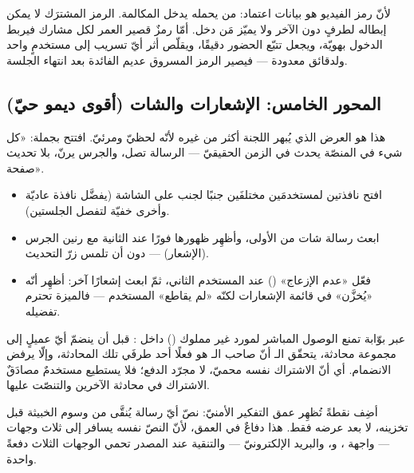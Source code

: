 \begin{qa}
لأنّ رمز الفيديو هو بيانات اعتماد: من يحمله يدخل المكالمة. الرمز المشترَك لا يمكن
إبطاله لطرفٍ دون الآخر ولا يميّز مَن دخل. أمّا رمزٌ قصير العمر لكل مشارك فيربط الدخول
بهويّة، ويجعل تتبّع الحضور دقيقًا، ويقلّص أثر أيّ تسريب إلى مستخدمٍ واحد ولدقائق
معدودة — فيصير الرمز المسروق عديم الفائدة بعد انتهاء الجلسة.
\end{qa}

\subsection{المحور الخامس: الإشعارات والشات (أقوى ديمو حيّ)}

هذا هو العرض الذي يُبهر اللجنة أكثر من غيره لأنّه لحظيّ ومرئيّ. افتتح بجملة: «كل شيء
في المنصّة يحدث في الزمن الحقيقيّ — الرسالة تصل، والجرس يرنّ، بلا تحديث صفحة».

\begin{idea}
\begin{itemize}
\item افتح نافذتين لمستخدمَين مختلفَين جنبًا لجنب على الشاشة (يفضَّل نافذة عاديّة
  وأخرى خفيّة  لتفصل الجلستين).
\item ابعث رسالة شات من الأولى، وأظهِر ظهورها فورًا عند الثانية مع رنين الجرس
  (الإشعار) — دون أن تلمس زرّ التحديث.
\item فعّل «عدم الإزعاج» () عند المستخدم الثاني، ثمّ ابعث إشعارًا
  آخر: أظهِر أنّه «يُخزَّن» في قائمة الإشعارات لكنّه «لم يقاطع» المستخدم — فالميزة
  تحترم تفضيله.
\end{itemize}
\end{idea}

\begin{qa}
عبر بوّابة تمنع الوصول المباشر لمورد غير مملوك () داخل : قبل
أن ينضمّ أيّ عميلٍ إلى مجموعة محادثة، يتحقّق الـ أنّ صاحب الـ هو
فعلًا أحد طرفَي تلك المحادثة، وإلّا يرفض الانضمام. أي أنّ الاشتراك نفسه محميّ، لا
مجرّد الدفع؛ فلا يستطيع مستخدمٌ مصادَقٌ الاشتراك في محادثة الآخرين والتنصّت عليها.
\end{qa}

\begin{secnote}
أضِف نقطةً تُظهِر عمق التفكير الأمنيّ: نصّ أيّ رسالة يُنقَّى من وسوم 
الخبيثة قبل تخزينه، لا بعد عرضه فقط. هذا دفاعٌ في العمق، لأنّ النصّ نفسه يسافر إلى
ثلاث وجهات — واجهة ، و، والبريد الإلكترونيّ — والتنقية عند
المصدر تحمي الوجهات الثلاث دفعةً واحدة.
\end{secnote}

